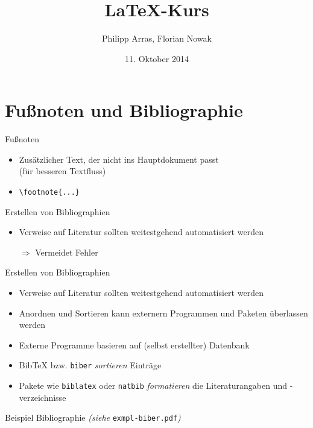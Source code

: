 \documentclass[11pt]{beamer}
\author{Philipp Arras, Florian Nowak}
\title{\LaTeX -Kurs}
\date{11. Oktober 2014}
\begin{document}


\section{Fußnoten und Bibliographie}
\begin{frame}[fragile]{Fußnoten}
\begin{itemize}
\item Zusätzlicher Text, der nicht ins Hauptdokument passt\\
(für besseren Textfluss)
\item \verb~\footnote{...}~
\end{itemize}
\end{frame}

\begin{frame}{Erstellen von Bibliographien}
\begin{itemize}
\item Verweise auf Literatur sollten weitestgehend automatisiert werden
\item[$\Rightarrow$] Vermeidet Fehler
\end{itemize}
\end{frame}

\begin{frame}{Erstellen von Bibliographien}
\begin{itemize}
\item Verweise auf Literatur sollten weitestgehend automatisiert werden
\item Anordnen und Sortieren kann externern Programmen und Paketen überlassen werden
\item Externe Programme basieren auf (selbst erstellter) Datenbank
\item Bib{\TeX} bzw. \texttt{biber} \emph{sortieren} Einträge
\item Pakete wie \texttt{biblatex} oder \texttt{natbib} \emph{formatieren} die Literaturangaben und -verzeichnisse
\end{itemize}
\end{frame}

\begin{frame}{Beispiel Bibliographie}
\emph{(siehe }\texttt{exmpl-biber.pdf}\emph{)}
\end{frame}
\end{document}
